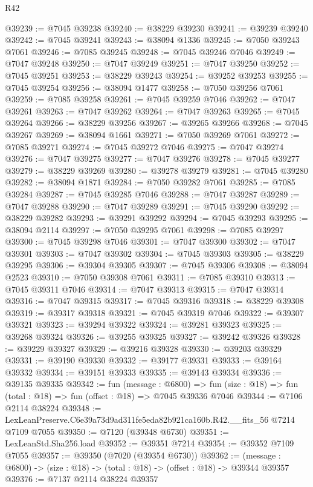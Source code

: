 \begin{lexlean}{R42}
\begin{coremodule}
{@39239 := @7045 @39238
@39240 := @38229 @39230
@39241 := @39239 @39240
@39242 := @7045 @39241
@39243 := @38094 @1336
@39245 := @7050 @39243 @7061
@39246 := @7085 @39245
@39248 := @7045 @39246 @7046
@39249 := @7047 @39248
@39250 := @7047 @39249
@39251 := @7047 @39250
@39252 := @7045 @39251
@39253 := @38229 @39243
@39254 := @39252 @39253
@39255 := @7045 @39254
@39256 := @38094 @1477
@39258 := @7050 @39256 @7061
@39259 := @7085 @39258
@39261 := @7045 @39259 @7046
@39262 := @7047 @39261
@39263 := @7047 @39262
@39264 := @7047 @39263
@39265 := @7045 @39264
@39266 := @38229 @39256
@39267 := @39265 @39266
@39268 := @7045 @39267
@39269 := @38094 @1661
@39271 := @7050 @39269 @7061
@39272 := @7085 @39271
@39274 := @7045 @39272 @7046
@39275 := @7047 @39274
@39276 := @7047 @39275
@39277 := @7047 @39276
@39278 := @7045 @39277
@39279 := @38229 @39269
@39280 := @39278 @39279
@39281 := @7045 @39280
@39282 := @38094 @1871
@39284 := @7050 @39282 @7061
@39285 := @7085 @39284
@39287 := @7045 @39285 @7046
@39288 := @7047 @39287
@39289 := @7047 @39288
@39290 := @7047 @39289
@39291 := @7045 @39290
@39292 := @38229 @39282
@39293 := @39291 @39292
@39294 := @7045 @39293
@39295 := @38094 @2114
@39297 := @7050 @39295 @7061
@39298 := @7085 @39297
@39300 := @7045 @39298 @7046
@39301 := @7047 @39300
@39302 := @7047 @39301
@39303 := @7047 @39302
@39304 := @7045 @39303
@39305 := @38229 @39295
@39306 := @39304 @39305
@39307 := @7045 @39306
@39308 := @38094 @2523
@39310 := @7050 @39308 @7061
@39311 := @7085 @39310
@39313 := @7045 @39311 @7046
@39314 := @7047 @39313
@39315 := @7047 @39314
@39316 := @7047 @39315
@39317 := @7045 @39316
@39318 := @38229 @39308
@39319 := @39317 @39318
@39321 := @7045 @39319 @7046
@39322 := @39307 @39321
@39323 := @39294 @39322
@39324 := @39281 @39323
@39325 := @39268 @39324
@39326 := @39255 @39325
@39327 := @39242 @39326
@39328 := @39229 @39327
@39329 := @39216 @39328
@39330 := @39203 @39329
@39331 := @39190 @39330
@39332 := @39177 @39331
@39333 := @39164 @39332
@39334 := @39151 @39333
@39335 := @39143 @39334
@39336 := @39135 @39335
@39342 := fun (message : @6800) =>
  fun (size : @18) => fun (total : @18) => fun (offset : @18) => @7045 @39336 @7046
@39344 := @7106 @2114 @38224
@39348 := LexLeanPreserve.C6e39a73d9ad311fe5eda82b921ca160b.R42.__fits_56 @7214 @7109 @7055
@39350 := @7120 (@39348 @6730)
@39351 := LexLeanStd.Sha256.load
@39352 := @39351 @7214
@39354 := @39352 @7109 @7055
@39357 := @39350 (@7020 (@39354 @6730))
@39362 := (message : @6800) -> (size : @18) -> (total : @18) -> (offset : @18) -> @39344 @39357
@39376 := @7137
    @2114
    @38224
    @39357
}
\end{coremodule}
\end{lexlean}
